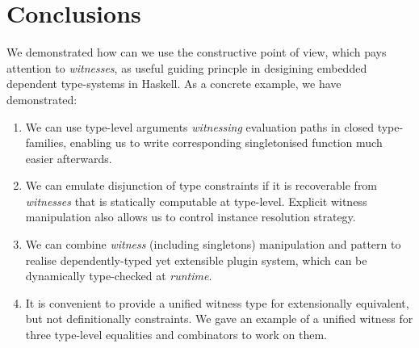 \documentclass[demotion-paper.tex]{subfiles}
\begin{document}
\section{Conclusions}
\label{sec:concl}
We demonstrated how can we use the constructive point of view, which pays attention to \emph{witnesses}, as useful guiding princple in desigining embedded dependent type-systems in Haskell.
As a concrete example, we have demonstrated:
\begin{enumerate}
  \item We can use type-level arguments \emph{witnessing} evaluation paths in closed type-families, enabling us to write corresponding singletonised function much easier afterwards.
  \item We can emulate disjunction of type constraints if it is recoverable from \emph{witnesses} that is statically computable at type-level. Explicit witness manipulation also allows us to control instance resolution strategy.
  \item We can combine \emph{witness} (including singletons) manipulation and  pattern to realise dependently-typed yet extensible plugin system, which can be dynamically type-checked at \emph{runtime}.
  \item It is convenient to provide a unified witness type for extensionally equivalent, but not definitionally constraints.
  We gave an example of a unified witness for three type-level equalities and combinators to work on them.
\end{enumerate}

\end{document}
